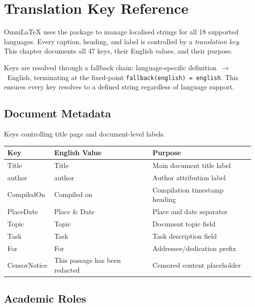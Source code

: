 \chapter{Translation Key Reference}
\label{ch:translation-keys}

OmniLaTeX uses the  package to manage localised
strings for all 18 supported languages.  Every caption, heading, and
label is controlled by a \emph{translation key}.  This chapter
documents all 47 keys, their English values, and their purpose.

Keys are resolved through a fallback chain: language-specific
definition~$\to$~English, terminating at the fixed-point
\texttt{fallback(english) = english}.  This ensures every key
resolves to a defined string regardless of language support.

\section{Document Metadata}
\label{sec:tl-meta}

Keys controlling title page and document-level labels.

\begin{tabularx}{\linewidth}{l l X}
  \toprule
  \textbf{Key} & \textbf{English Value} & \textbf{Purpose} \\
  \midrule
  Title            & Title              & Main document title label \\
  author           & author             & Author attribution label \\
  CompiledOn       & Compiled on        & Compilation timestamp heading \\
  PlaceDate        & Place \& Date      & Place and date separator \\
  Topic            & Topic              & Document topic field \\
  Task             & Task               & Task description field \\
  For              & For                & Addressee/dedication prefix \\
  CensorNotice     & This passage has been redacted & Censored content placeholder \\
  \bottomrule
\end{tabularx}

\section{Academic Roles}
\label{sec:tl-academic}

